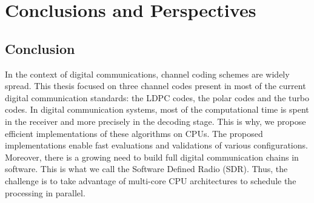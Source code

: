 
\graphicspath{{main/conclusion/fig/}}

\chapter*{Conclusions and Perspectives}

\section*{Conclusion}

In the context of digital communications, channel coding schemes are widely
spread. This thesis focused on three channel codes present in most of the
current digital communication standards: the LDPC codes, the polar codes and the
turbo codes. In digital communication systems, most of the computational
time is spent in the receiver and more precisely in the decoding stage. This is
why, we propose efficient implementations of these algorithms on CPUs. The
proposed implementations enable fast evaluations and validations of various
configurations. Moreover, there is a growing need to build full digital
communication chains in software. This is what we call the Software Defined
Radio (SDR). Thus, the challenge is to take advantage of multi-core CPU
architectures to schedule the processing in parallel.

